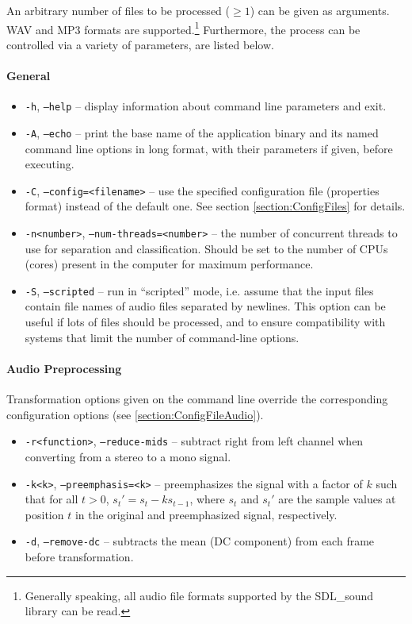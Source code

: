 An arbitrary number of files to be processed ($\geq 1$) can be given as
arguments. WAV and MP3 formats are supported.\footnote{Generally speaking, all
  audio file formats supported by the SDL\_sound library can be read.}
Furthermore, the process can be controlled via a variety of parameters,
are listed below.

\paragraph{General}

\begin{itemize}
  \item {\tt -h}, {\tt --help} -- display information about command line
    parameters and exit.
  \item {\tt -A}, {\tt --echo} -- print the base name of the application binary
    and its named command line options in long format, with their parameters if 
    given, before executing.
  \item {\tt -C}, {\tt --config=<filename>} -- use the specified configuration
    file (properties format) instead of the default one. See section 
    \ref{section:ConfigFiles} for details.
  \item {\tt -n<number>}, {\tt --num-threads=<number>} -- the number of
    concurrent threads to use for separation and classification. Should be set
    to the number of CPUs (cores) present in the computer for maximum
    performance.
  \item {\tt -S}, {\tt --scripted} -- run in ``scripted'' mode, i.e. assume that
    the input files contain file names of audio files separated by
    newlines. This option can be useful if lots of files should be processed,
    and to ensure compatibility with systems that limit the number of
    command-line options.
\end{itemize}

\paragraph{Audio Preprocessing}

Transformation options given on the command line override the corresponding 
configuration options (see \ref{section:ConfigFileAudio}).

\begin{itemize}
  \item {\tt -r<function>}, {\tt --reduce-mids} -- subtract right from left
    channel when converting from a stereo to a mono signal.
  \item {\tt -k<k>}, {\tt --preemphasis=<k>} -- preemphasizes the signal with
    a factor of $k$ such that for all $t > 0$, $s_t' = s_t - ks_{t-1}$, where
    $s_t$ and $s_t'$ are the sample values at position $t$ in the original and
    preemphasized signal, respectively.
  \item {\tt -d}, {\tt --remove-dc} -- subtracts the mean (DC component) from
    each frame before transformation.
\end{itemize}


